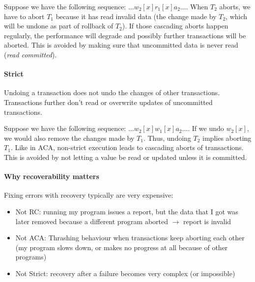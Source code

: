 Suppose we have the following sequence: $\ldots w_2[x] r_1[x] a_2 \ldots$.
When $T_2$ aborts, we have to abort $T_1$ because it has read invalid data (the change made by $T_2$, which will be undone as part of rollback of $T_2$).
If those cascading aborts happen regularly, the performance will degrade and possibly further transactions will be aborted.
This is avoided by making sure that uncommitted data is never read (\textit{read committed}).


\paragraph{Strict}
Undoing a transaction does not undo the changes of other transactions. Transactions further don't read or overwrite updates of uncommitted transactions.

Suppose we have the following sequence: $\ldots w_2[x] w_1[x] a_2 \ldots$.
If we undo $w_2[x]$, we would also remove the changes made by $T_1$. Thus, undoing $T_2$ implies aborting $T_1$.
Like in ACA, non-strict execution leads to cascading aborts of transactions.
This is avoided by not letting a value be read or updated unless it is committed.


\paragraph{Why recoverability matters}
Fixing errors with recovery typically are very expensive:
\begin{itemize}
    \item Not RC: running my program issues a report, but the data that I got was later removed because a different program aborted $\rightarrow$ report is invalid
    \item Not ACA: Thrashing behaviour when transactions keep aborting each other (my program slows down, or makes no progress at all because of other programs)
    \item Not Strict: recovery after a failure becomes very complex (or impossible)
\end{itemize}
